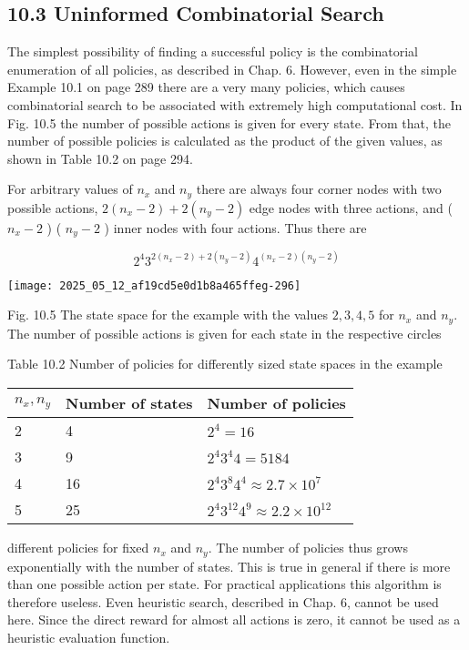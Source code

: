 \documentclass[10pt]{article}
\begin{document}
\subsection*{10.3 Uninformed Combinatorial Search}
The simplest possibility of finding a successful policy is the combinatorial enumeration of all policies, as described in Chap. 6. However, even in the simple Example 10.1 on page 289 there are a very many policies, which causes combinatorial search to be associated with extremely high computational cost. In Fig. 10.5 the number of possible actions is given for every state. From that, the number of possible policies is calculated as the product of the given values, as shown in Table 10.2 on page 294.

For arbitrary values of $n_{x}$ and $n_{y}$ there are always four corner nodes with two possible actions, $2\left(n_{x}-2\right)+2\left(n_{y}-2\right)$ edge nodes with three actions, and ( $n_{x}-2$ ) ( $n_{y}-2$ ) inner nodes with four actions. Thus there are

$$
2^{4} 3^{2\left(n_{x}-2\right)+2\left(n_{y}-2\right)} 4^{\left(n_{x}-2\right)\left(n_{y}-2\right)}
$$

\begin{center}
\texttt{[image: 2025\_05\_12\_af19cd5e0d1b8a465ffeg-296]}
\end{center}

Fig. 10.5 The state space for the example with the values $2,3,4,5$ for $n_{x}$ and $n_{y}$. The number of possible actions is given for each state in the respective circles

Table 10.2 Number of policies for differently sized state spaces in the example

\begin{center}
\begin{tabular}{lll}
\hline
$n_{x}, n_{y}$ & Number of states & Number of policies \\
\hline
2 & 4 & $2^{4}=16$ \\
\hline
3 & 9 & $2^{4} 3^{4} 4=5184$ \\
\hline
4 & 16 & $2^{4} 3^{8} 4^{4} \approx 2.7 \times 10^{7}$ \\
\hline
5 & 25 & $2^{4} 3^{12} 4^{9} \approx 2.2 \times 10^{12}$ \\
\hline
\end{tabular}
\end{center}

different policies for fixed $n_{x}$ and $n_{y}$. The number of policies thus grows exponentially with the number of states. This is true in general if there is more than one possible action per state. For practical applications this algorithm is therefore useless. Even heuristic search, described in Chap. 6, cannot be used here. Since the direct reward for almost all actions is zero, it cannot be used as a heuristic evaluation function.
\end{document}
